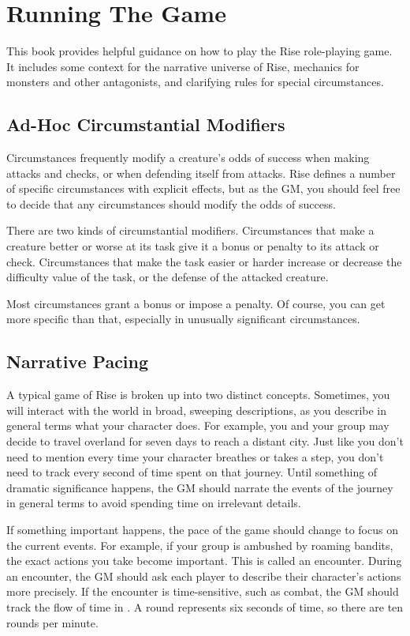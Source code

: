 \chapter{Running The Game}

This book provides helpful guidance on how to play the Rise role-playing game.
It includes some context for the narrative universe of Rise, mechanics for monsters and other antagonists, and clarifying rules for special circumstances.

\section{Ad-Hoc Circumstantial Modifiers}
  Circumstances frequently modify a creature's odds of success when making attacks and checks, or when defending itself from attacks.
  Rise defines a number of specific circumstances with explicit effects, but as the GM, you should feel free to decide that any circumstances should modify the odds of success.

  There are two kinds of circumstantial modifiers.
  Circumstances that make a creature better or worse at its task give it a bonus or penalty to its attack or check.
  Circumstances that make the task easier or harder increase or decrease the difficulty value of the task, or the defense of the attacked creature.

  Most circumstances grant a  bonus or impose a  penalty.
  Of course, you can get more specific than that, especially in unusually significant circumstances.

\section{Narrative Pacing}
  A typical game of Rise is broken up into two distinct concepts.
  Sometimes, you will interact with the world in broad, sweeping descriptions, as you describe in general terms what your character does.
  For example, you and your group may decide to travel overland for seven days to reach a distant city.
  Just like you don't need to mention every time your character breathes or takes a step, you don't need to track every second of time spent on that journey.
  Until something of dramatic significance happens, the GM should narrate the events of the journey in general terms to avoid spending time on irrelevant details.

  If something important happens, the pace of the game should change to focus on the current events.
  For example, if your group is ambushed by roaming bandits, the exact actions you take become important.
  This is called an encounter.
  During an encounter, the GM should ask each player to describe their character's actions more precisely.
  If the encounter is time-sensitive, such as combat, the GM should track the flow of time in .
  A round represents six seconds of time, so there are ten rounds per minute.

